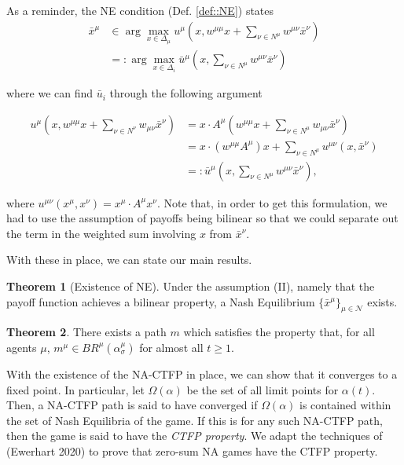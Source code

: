 \documentclass{article}
\theoremstyle{definition}
\newtheorem{theorem}{Theorem}
\newcommand{\agentset}{\mathcal{N}}
\newcommand{\xmu}{x^{\mu}}
\newcommand{\NE}[1]{\bar{x}^{#1}}
\begin{document}
  As a reminder, the NE condition (Def. \ref{def::NE}) states
%
  \begin{align}
    \NE{\mu} &\in \arg\max_{x \in \Delta_\mu} u^\mu(x, w^{\mu \mu}x + \sum_{\nu \in N^\mu} w^{\mu \nu} \NE{\nu}) \nonumber \\
    & =: \arg\max_{x \in \Delta_i} \bar{u}^\mu(x, \sum_{\nu \in N^\mu} w^{\mu \nu} \NE{\nu})
  \end{align}

  where we can find $\bar{u}_i$ through the following argument
  
  \begin{align}
    u^\mu(x, w^{\mu \mu} x + \sum_{\nu \in N^\nu} w_{\mu \nu} \NE{\nu}) & = x \cdot A^\mu (w^{\mu \mu} x + \sum_{\nu \in N^\mu} w_{\mu \nu} \NE{\nu}) \\
     & = x \cdot (w^{\mu \mu} A^\mu)  x + \sum_{\nu \in N^\mu} u^{\mu \nu}(x, \NE{\nu}) \\
     & =: \bar{u}^\mu(x, \sum_{\nu \in N^\mu} w^{\mu \nu} \NE{\nu}), \nonumber
  \end{align}
  
  where $u^{\mu \nu}(\xmu, x^\nu) = \xmu \cdot A^\mu x^\nu$. Note
  that, in order to get this formulation, we had to use the assumption
  of payoffs being bilinear so that we could separate out the term in
  the weighted sum involving $x$ from $\bar{x}^\nu$.

  With these in place, we can state our main results.
  
  \begin{theorem}[Existence of NE]
    Under the assumption (II), namely that the payoff function achieves a bilinear property, a
    Nash Equilibrium $\{\bar{x}^\mu\}_{\mu \in \agentset}$ exists.
  \end{theorem}


  \begin{theorem}
    There exists a path $m$ which satisfies the property that, for all agents $\mu$, $m^\mu \in
    BR^\mu(\alpha_\sigma^\mu)$ for almost all $t \geq 1$.
  \end{theorem}

With the existence of the NA-CTFP in place, we can show that it converges
to a fixed point. In particular, let $\Omega(\alpha)$ be the set of
all limit points for $\alpha(t)$. Then, a NA-CTFP path is said to have
converged if $\Omega(\alpha)$ is contained within the set of Nash
Equilibria of the game. If this is for any such NA-CTFP path, then the
game is said to have the \emph{CTFP property}. We adapt the techniques
of (Ewerhart 2020) to prove that zero-sum NA games have the CTFP
property.
\end{document}
